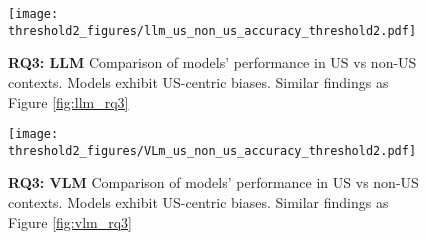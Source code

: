 \begin{figure}[!htbp]
    \centering
    \texttt{[image: threshold2\_figures/llm\_us\_non\_us\_accuracy\_threshold2.pdf]}
    \caption{\textbf{RQ3: LLM} Comparison of models' performance in US vs non-US contexts. Models exhibit US-centric biases. Similar findings as Figure \ref{fig:llm_rq3}}
    \label{fig:thresh2_llm_rq3}
\end{figure}

\begin{figure}[!htbp]
    \centering
    \texttt{[image: threshold2\_figures/VLm\_us\_non\_us\_accuracy\_threshold2.pdf]}
    \caption{\textbf{RQ3: VLM} Comparison of models' performance in US vs non-US contexts. Models exhibit US-centric biases. Similar findings as Figure \ref{fig:vlm_rq3}}
    \label{fig:thresh2_vlm_rq3}
\end{figure}





